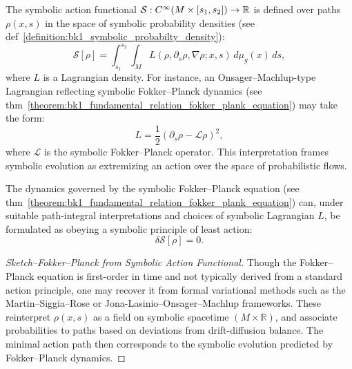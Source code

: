 \begin{definition}
\label{definition:bk1_symbolic_action_functional}
The symbolic action functional $\mathcal{S}: C^\infty(M \times [s_1, s_2]) \to \mathbb{R}$ is defined over paths $\rho(x,s)$ in the space of symbolic probability densities (see def~\ref{definition:bk1_symbolic_probabilty_density}):
\[
\mathcal{S}[\rho] = \int_{s_1}^{s_2} \int_M L(\rho, \partial_s \rho, \nabla \rho; x, s) \, d\mu_g(x) \, ds,
\]
where $L$ is a Lagrangian density. For instance, an Onsager–Machlup-type Lagrangian reflecting symbolic Fokker–Planck dynamics (see thm~\ref{theorem:bk1_fundamental_relation_fokker_plank_equation}) may take the form:
\[
L = \frac{1}{2} \left( \partial_s \rho - \mathcal{L} \rho \right)^2,
\]
where $\mathcal{L}$ is the symbolic Fokker–Planck operator. This interpretation frames symbolic evolution as extremizing an action over the space of probabilistic flows.
\end{definition}

\begin{theorem}
\label{theorem:bk1_princple_of_least_action}
The dynamics governed by the symbolic Fokker–Planck equation (see thm~\ref{theorem:bk1_fundamental_relation_fokker_plank_equation}) can, under suitable path-integral interpretations and choices of symbolic Lagrangian $L$, be formulated as obeying a symbolic principle of least action:
\[
\delta \mathcal{S}[\rho] = 0.
\]

\begin{proof}[Sketch–Fokker–Planck from Symbolic Action Functional]
\label{proof:bk1_sketch_fokker_planck_action}
Though the Fokker–Planck equation is first-order in time and not typically derived from a standard action principle, one may recover it from formal variational methods such as the Martin–Siggia–Rose or Jona-Lasinio–Onsager–Machlup frameworks. These reinterpret $\rho(x,s)$ as a field on symbolic spacetime $(M \times \mathbb{R})$, and associate probabilities to paths based on deviations from drift-diffusion balance. The minimal action path then corresponds to the symbolic evolution predicted by Fokker–Planck dynamics.
\end{proof}
\end{theorem}

